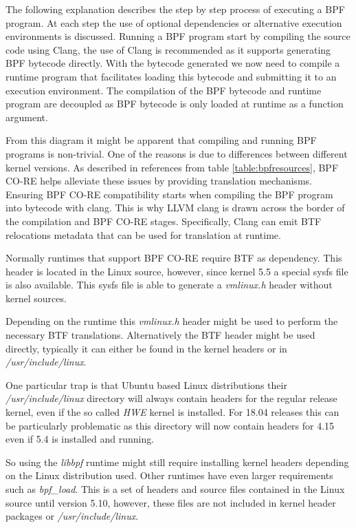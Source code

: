 \documentclass[conference]{IEEEtran}
\begin{document}
The following explanation describes the step by step process of executing a BPF
program. At each step the use of optional dependencies or alternative execution
environments is discussed. Running a BPF program start by compiling the source
code using Clang, the use of Clang is recommended as it supports
generating BPF bytecode directly. With the bytecode generated we now need to
compile a runtime program that facilitates loading this bytecode and submitting
it to an execution environment. The compilation of the BPF bytecode and runtime
program are decoupled as BPF bytecode is only loaded at runtime as a function
argument.

From this diagram it might be apparent that compiling and running BPF programs
is non-trivial. One of the reasons is due to differences between different
kernel versions. As described in references from table \ref{table:bpfresources},
BPF CO-RE helps  alleviate these issues by providing translation mechanisms.
Ensuring BPF CO-RE compatibility starts when compiling the BPF program into
bytecode with clang. This is why LLVM clang is drawn across the border of the
compilation and BPF CO-RE stages. Specifically, Clang can emit BTF relocations
metadata that can be used for translation at runtime.

Normally runtimes that support BPF CO-RE require BTF as dependency. This header
is located in the Linux source, however, since kernel 5.5 a special sysfs file
is also available. This sysfs file is able to generate a \textit{vmlinux.h}
header without kernel sources.

Depending on the runtime this \textit{vmlinux.h} header might be used to
perform the necessary BTF translations. Alternatively the BTF header might be
used directly, typically it can either be found in the kernel headers or in
\textit{/usr/include/linux}.

One particular trap is that Ubuntu based Linux
distributions their \textit{/usr/include/linux} directory will always contain
headers for the regular release kernel, even if the so called \textit{HWE}
kernel is installed. For 18.04 releases this can be particularly problematic as
this directory will now contain headers for 4.15 even if 5.4 is installed and
running.

So using the \textit{libbpf} runtime might still require installing kernel
headers depending on the Linux distribution used. Other runtimes have even
larger requirements such as \textit{bpf\_load}. This is a set of headers and
source files contained in the Linux source until version 5.10, however, these
files are not included in kernel header packages or \textit{/usr/include/linux}.
\end{document}
